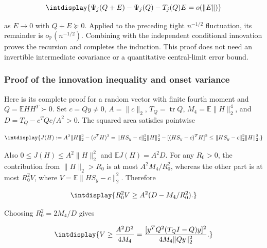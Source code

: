 \begingroup\renewcommand{\theHequation}{intdisplay.483}
\begin{equation*}
\intdisplay{
\Psi_j(Q+E)-\Psi_j(Q)-T_j(Q)E=o(\|E\|)
}
\end{equation*}
\endgroup


as \(E\to0\) with \(Q+E\succeq0\). Applied to the preceding tight \(n^{-1/2}\) fluctuation, its remainder is \(o_{\mathbb P}(n^{-1/2})\). Combining with the independent conditional innovation proves the recursion and completes the induction. This proof does not need an invertible intermediate covariance or a quantitative central-limit error bound.


\subsubsection{Proof of the innovation inequality and onset variance}



Here is its complete proof for a random vector with finite fourth moment and \(Q=\mathbb E HH^T\succ0\). Set \(c=Qy\ne0\), \(A=\|c\|_2\), \(T_Q=\operatorname{tr}Q\), \(M_4=\mathbb E\|H\|_2^4\), and \(D=T_Q-c^TQc/A^2>0\). The squared area satisfies pointwise


\begingroup\renewcommand{\theHequation}{intdisplay.484}
\begin{equation*}
\intdisplay{
J(H):=A^2\|H\|_2^2-(c^TH)^2
=\|HS_y-c\|_2^2\|H\|_2^2-[(HS_y-c)^TH]^2
\le\|HS_y-c\|_2^2\|H\|_2^2.
}
\end{equation*}
\endgroup


Also \(0\le J(H)\le A^2\|H\|_2^2\) and \(\mathbb EJ(H)=A^2D\). For any \(R_0>0\), the contribution from \(\|H\|_2>R_0\) is at most \(A^2M_4/R_0^2\), whereas the other part is at most \(R_0^2V\), where \(V=\mathbb E\|HS_y-c\|_2^2\). Therefore


\begingroup\renewcommand{\theHequation}{intdisplay.485}
\begin{equation*}
\intdisplay{
R_0^2V\ge A^2(D-M_4/R_0^2).
}
\end{equation*}
\endgroup


Choosing \(R_0^2=2M_4/D\) gives


\begingroup\renewcommand{\theHequation}{intdisplay.486}
\begin{equation*}
\intdisplay{
V\ge\frac{A^2D^2}{4M_4}
=\frac{[y^TQ^2(T_QI-Q)y]^2}{4M_4\|Qy\|_2^2}.
}
\end{equation*}
\endgroup

